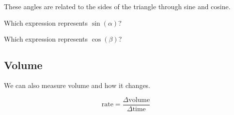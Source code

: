 \documentclass{ximera}
\begin{document}
These angles are related to the sides of the triangle through sine and cosine.










\begin{question} 


Which expression represents $\sin(\alpha)$?

\begin{multipleChoice}
\end{multipleChoice}

\end{question}









\begin{question} 


Which expression represents $\cos(\beta)$?

\begin{multipleChoice}
\end{multipleChoice}

\end{question}




























\subsection*{Volume}







We can also measure volume and how it changes.



\[
\text{rate} = \frac{\Delta \text{volume}}{\Delta \text{time}} 
\]
\end{document}

